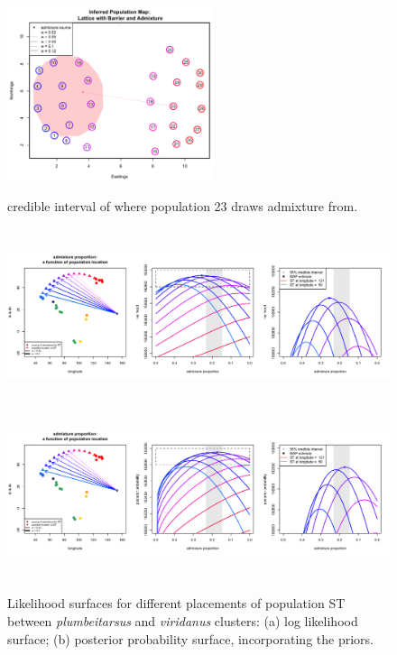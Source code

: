 \documentclass[12pt]{article}
\begin{document}
\begin{figure}[ht!]
	\centering
		{\includegraphics[width=2.4in,height=2in]{figs/GeoGenMap_barr_inland_admixture_2.png}}
	\caption{credible interval of where population 23 draws admixture from.}
\label{sfig:barr_inland_ad_credset}
\end{figure}

\begin{figure}
	\centering
			{\includegraphics[width=6in,height=2in]{figs/admix_prop_func_loc_lnl.png}}
			{\includegraphics[width=6in,height=2in]{figs/admix_prop_func_loc_prob.png}}
	\caption{Likelihood surfaces for different placements of population ST between \textit{plumbeitarsus} and \textit{viridanus} clusters: (a) log likelihood surface; (b) posterior probability surface, incorporating the priors.}\label{sfig:admix_prop_func_loc}
\end{figure}
\end{document}
